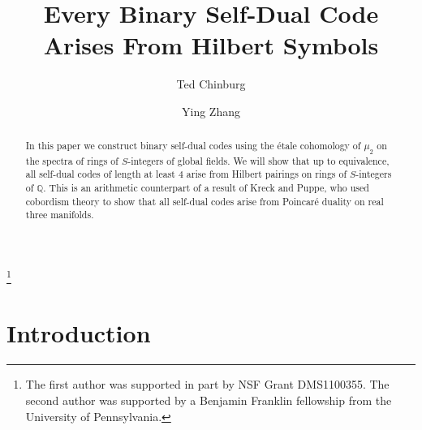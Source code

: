 \documentclass[noams]{compositio}
\theoremstyle{definition} %
\theoremstyle{remark} %
\newcommand{\Q}{\mathbb{Q}}
\begin{document}
\title{Every Binary Self-Dual Code Arises From Hilbert Symbols}
%
\author{Ted Chinburg}
\address{Dept of Math\\Univ. of Pennsylvania\\209 S. 33rd Str\\Philadelphia\\PA19104-6395\\USA}
%
\author{Ying Zhang}
\address{Dept of Math\\Univ. of Pennsylvania\\209 S. 33rd Str\\Philadelphia\\PA19104-6395\\USA}
%
\dedication{\rm Oct 18, 2012}
\thanks{The first author was supported in part by  NSF Grant DMS1100355. The second author was
supported by a Benjamin Franklin fellowship from the University of Pennsylvania.}



\begin{abstract}
In this paper we construct binary self-dual codes using the \'etale cohomology of $\mu_2$ on the spectra of rings of $S$-integers of global fields. We will show that up to equivalence, all self-dual codes of length at least $4$ arise from Hilbert pairings on rings of $S$-integers of $\Q$.
This is an arithmetic counterpart of a result of Kreck and Puppe, who used cobordism
theory to show that
all self-dual codes arise from Poincar\'e duality on real three manifolds.
\end{abstract}

\maketitle

\section{Introduction}
\label{sec:intro}
\end{document}
